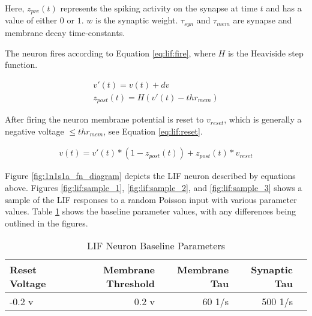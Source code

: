 Here, $z_{pre}(t)$ represents the spiking activity on the synapse at time
$t$ and has a value of either $0$ or $1$. $w$ is the synaptic
weight. $\tau_{syn}$ and $\tau_{mem}$ are synapse and membrane decay
time-constants.

The neuron fires according to Equation \ref{eq:lif:fire}, where $H$ is the
Heaviside step function.

\begin{align}
v'(t) = v(t) + dv \label{eq:lif:v_update} \\
z_{post}(t) = H(v'(t) - thr_{mem}) \label{eq:lif:fire}
\end{align}

After firing the neuron membrane potential is reset to $v_{reset}$, which is
generally a negative voltage $\leq thr_{mem}$, see Equation \ref{eq:lif:reset}.

\begin{align}
v(t) = v'(t) * (1 - z_{post}(t)) + z_{post}(t) * v_{reset} \label{eq:lif:reset}
\end{align}

Figure \ref{fig:1n1s1a_fn_diagram} depicts the LIF neuron described by
equations above. Figures \ref{fig:lif:sample_1}, \ref{fig:lif:sample_2}, and
\ref{fig:lif:sample_3} shows a sample of the LIF responses to a random
Poisson input with various parameter values. Table \ref{table:lif_params} shows
the baseline parameter values, with any differences being outlined in the
figures.

\begin{table}[!htp]\centering
  \caption{LIF Neuron Baseline Parameters} \label{table:lif_params}
  \scriptsize
  \begin{tabular}{lrrrr}\toprule
    Reset Voltage &Membrane Threshold &Membrane Tau &Synaptic Tau \\\midrule
    -0.2 v &0.2 v &60 1/s &500 1/s \\
    \bottomrule
  \end{tabular}
\end{table}




